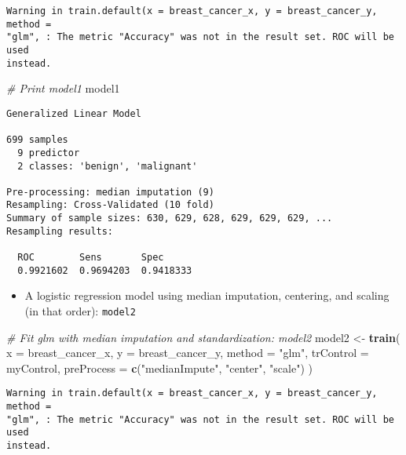 \documentclass[]{book}
\newenvironment{Shaded}{\begin{snugshade}}{\end{snugshade}}
\newcommand{\KeywordTok}[1]{\textcolor[rgb]{0.13,0.29,0.53}{\textbf{#1}}}
\newcommand{\DataTypeTok}[1]{\textcolor[rgb]{0.13,0.29,0.53}{#1}}
\newcommand{\StringTok}[1]{\textcolor[rgb]{0.31,0.60,0.02}{#1}}
\newcommand{\CommentTok}[1]{\textcolor[rgb]{0.56,0.35,0.01}{\textit{#1}}}
\newcommand{\NormalTok}[1]{#1}
\providecommand{\tightlist}{%
  \setlength{\itemsep}{0pt}\setlength{\parskip}{0pt}}
\begin{document}
\begin{verbatim}
Warning in train.default(x = breast_cancer_x, y = breast_cancer_y, method =
"glm", : The metric "Accuracy" was not in the result set. ROC will be used
instead.
\end{verbatim}

\begin{Shaded}
\begin{Highlighting}[]
\CommentTok{# Print model1}
\NormalTok{model1}
\end{Highlighting}
\end{Shaded}

\begin{verbatim}
Generalized Linear Model 

699 samples
  9 predictor
  2 classes: 'benign', 'malignant' 

Pre-processing: median imputation (9) 
Resampling: Cross-Validated (10 fold) 
Summary of sample sizes: 630, 629, 628, 629, 629, 629, ... 
Resampling results:

  ROC        Sens       Spec     
  0.9921602  0.9694203  0.9418333
\end{verbatim}

\begin{itemize}
\tightlist
\item
  A logistic regression model using median imputation, centering, and
  scaling (in that order): \texttt{model2}
\end{itemize}

\begin{Shaded}
\begin{Highlighting}[]
\CommentTok{# Fit glm with median imputation and standardization: model2}
\NormalTok{model2 <-}\StringTok{ }\KeywordTok{train}\NormalTok{(}
  \DataTypeTok{x =}\NormalTok{ breast_cancer_x, }\DataTypeTok{y =}\NormalTok{ breast_cancer_y,}
  \DataTypeTok{method =} \StringTok{"glm"}\NormalTok{,}
  \DataTypeTok{trControl =}\NormalTok{ myControl,}
  \DataTypeTok{preProcess =} \KeywordTok{c}\NormalTok{(}\StringTok{"medianImpute"}\NormalTok{, }\StringTok{"center"}\NormalTok{, }\StringTok{"scale"}\NormalTok{)}
\NormalTok{)}
\end{Highlighting}
\end{Shaded}

\begin{verbatim}
Warning in train.default(x = breast_cancer_x, y = breast_cancer_y, method =
"glm", : The metric "Accuracy" was not in the result set. ROC will be used
instead.
\end{verbatim}
\end{document}
